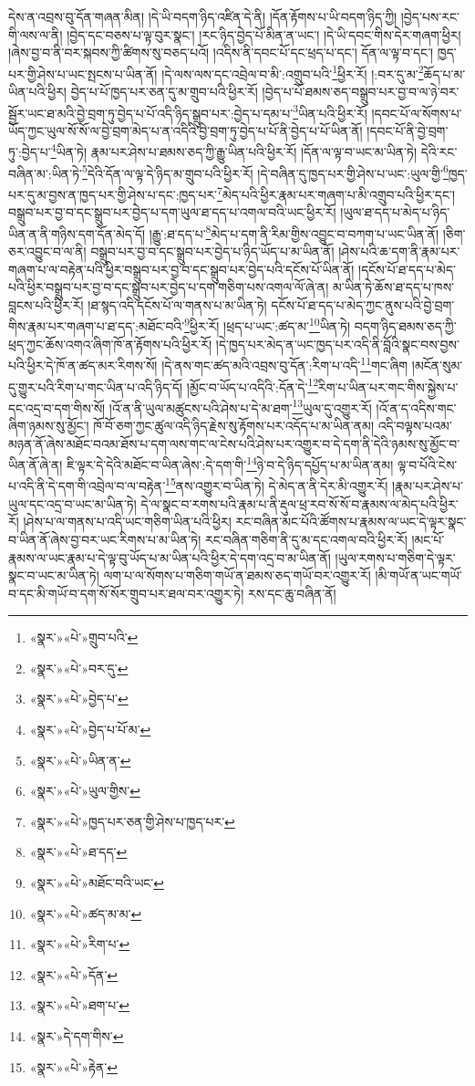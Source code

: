 དེས་ན་འབྲས་བུ་དོན་གཞན་མིན། །དེ་ཡི་བདག་ཉིད་འཛིན་དེ་ནི། །དོན་རྟོགས་པ་ཡི་བདག་ཉིད་ཀྱི། །བྱེད་པས་རང་གི་ལས་ལ་ནི། །བྱེད་དང་བཅས་པ་ལྟ་བུར་སྣང་། །རང་ཉིད་བྱེད་པོ་མིན་ན་ཡང་། །དེ་ཡི་དབང་གིས་དེར་གཞག་ཕྱིར། །ཞེས་བྱ་བ་ནི་བར་སྐབས་ཀྱི་ཚིགས་སུ་བཅད་པའོ། །འདིས་ནི་དབང་པོ་དང་ཕྲད་པ་དང་། དོན་ལ་ལྟ་བ་དང་། ཁྱད་པར་གྱི་ཤེས་པ་ཡང་སྤངས་པ་ཡིན་ནོ། །དེ་ལས་ལས་དང་འབྲེལ་བ་མི་:འགྲུབ་པའི་\footnote{«སྣར་»«པེ་»གྲུབ་པའི་}ཕྱིར་རོ། །:བར་དུ་མ་\footnote{«སྣར་»«པེ་»བར་དུ་}ཆོད་པ་མ་ཡིན་པའི་ཕྱིར། བྱེད་པ་པོ་ཁྱད་པར་ཅན་དུ་མ་གྲུབ་པའི་ཕྱིར་རོ། །བྱེད་པ་པོ་ཐམས་ཅད་བསྒྲུབ་པར་བྱ་བ་ལ་ཉེ་བར་སྦྱོར་ཡང་ཐ་མའི་བྱེ་བྲག་ཏུ་བྱེད་པ་པོ་འདི་ཉིད་སྒྲུབ་པར་:བྱེད་པ་དམ་པ་\footnote{«སྣར་»«པེ་»བྱེད་པ་}ཡིན་པའི་ཕྱིར་རོ། །དབང་པོ་ལ་སོགས་པ་ཡོད་ཀྱང་ཡུལ་སོ་སོ་ལ་བྱེ་བྲག་མེད་པ་ན་འདིའི་བྱེ་བྲག་ཏུ་བྱེད་པ་པོ་ནི་བྱེད་པ་པོ་ཡིན་ནོ། །དབང་པོ་ནི་བྱེ་བྲག་ཏུ་:བྱེད་པ་\footnote{«སྣར་»«པེ་»བྱེད་པ་པོ་མ་}ཡིན་ཏེ། རྣམ་པར་ཤེས་པ་ཐམས་ཅད་ཀྱི་རྒྱུ་ཡིན་པའི་ཕྱིར་རོ། །དོན་ལ་ལྟ་བ་ཡང་མ་ཡིན་ཏེ། དེའི་རང་བཞིན་མ་:ཡིན་ཏེ་\footnote{«སྣར་»«པེ་»ཡིན་ན་}དེའི་དོན་ལ་ལྟ་དེ་ཉིད་མ་གྲུབ་པའི་ཕྱིར་རོ། །དེ་བཞིན་དུ་ཁྱད་པར་གྱི་ཤེས་པ་ཡང་:ཡུལ་གྱི་\footnote{«སྣར་»«པེ་»ཡུལ་གྱིས་}ཁྱད་པར་དུ་མ་བྱས་ན་ཁྱད་པར་གྱི་ཤེས་པ་དང་:ཁྱད་པར་\footnote{«སྣར་»«པེ་»ཁྱད་པར་ཅན་གྱི་ཤེས་པ་ཁྱད་པར་}མེད་པའི་ཕྱིར་རྣམ་པར་གཞག་པ་མི་འགྲུབ་པའི་ཕྱིར་དང་། བསྒྲུབ་པར་བྱ་བ་དང་སྒྲུབ་པར་བྱེད་པ་དག་ཡུལ་ཐ་དད་པ་འགལ་བའི་ཡང་ཕྱིར་རོ། །ཡུལ་ཐ་དད་པ་མེད་པ་ཉིད་ཡིན་ན་ནི་གཉིས་དག་དོན་མེད་དོ། །རྒྱུ་:ཐ་དད་པ་\footnote{«སྣར་»«པེ་»ཐ་དད་}མེད་པ་དག་ནི་རིམ་གྱིས་འབྱུང་བ་བཀག་པ་ཡང་ཡིན་ནོ། །ཅིག་ཅར་འབྱུང་བ་ལ་ནི། བསྒྲུབ་པར་བྱ་བ་དང་སྒྲུབ་པར་བྱེད་པ་ཉིད་ཡོད་པ་མ་ཡིན་ནོ། །ཤེས་པའི་ཆ་དག་ནི་རྣམ་པར་གཞག་པ་ལ་བརྟེན་པའི་ཕྱིར་བསྒྲུབ་པར་བྱ་བ་དང་སྒྲུབ་པར་བྱེད་པའི་དངོས་པོ་ཡིན་ནོ། །དངོས་པོ་ཐ་དད་པ་མེད་པའི་ཕྱིར་བསྒྲུབ་པར་བྱ་བ་དང་སྒྲུབ་པར་བྱེད་པ་དག་གཅིག་པས་འགལ་ལོ་ཞེ་ན། མ་ཡིན་ཏེ་ཆོས་ཐ་དད་པ་ཁས་བླངས་པའི་ཕྱིར་རོ། །ཐ་སྙད་འདི་དངོས་པོ་ལ་གནས་པ་མ་ཡིན་ཏེ། དངོས་པོ་ཐ་དད་པ་མེད་ཀྱང་ནུས་པའི་བྱེ་བྲག་གིས་རྣམ་པར་གཞག་པ་ཐ་དད་:མཐོང་བའི་\footnote{«སྣར་»«པེ་»མཐོང་བའི་ཡང་}ཕྱིར་རོ། །ཕྲད་པ་ཡང་:ཚད་མ་\footnote{«སྣར་»«པེ་»ཚད་མ་མ་}ཡིན་ཏེ། བདག་ཉིད་ཐམས་ཅད་ཀྱི་ཕྲད་ཀྱང་ཆོས་འགའ་ཞིག་ཁོ་ན་རྟོགས་པའི་ཕྱིར་རོ། །དེ་ཁྱད་པར་མེད་ན་ཡང་ཁྱད་པར་འདི་ནི་བློའི་སྣང་བས་བྱས་པའི་ཕྱིར་དེ་ཁོ་ན་ཚད་མར་རིགས་སོ། །དེ་ནས་གང་ཚད་མའི་འབྲས་བུ་དོན་:རིག་པ་འདི་\footnote{«སྣར་»«པེ་»རིག་པ་}གང་ཞིག །མངོན་སུམ་དུ་གྱུར་པའི་རིག་པ་གང་ཡིན་པ་འདི་ཉིད་དོ། །མྱོང་བ་ཡོད་པ་འདིའི་:དོན་དེ་\footnote{«སྣར་»«པེ་»དོན་}རིག་པ་ཡིན་པར་གང་གིས་སྐྱེས་པ་དང་འདྲ་བ་དག་གིས་སོ། །འོ་ན་ནི་ཡུལ་མཚུངས་པའི་ཤེས་པ་དེ་མ་ཐག་\footnote{«སྣར་»«པེ་»ཐག་པ་}ཡུལ་དུ་འགྱུར་རོ། །འོ་ན་ད་འདིས་གང་ཞིག་ཉམས་སུ་མྱོང་། ཁོ་བོ་ཅག་ཀྱང་ཚུལ་འདི་ཉིད་རྗེས་སུ་རྟོགས་པར་འདོད་པ་མ་ཡིན་ནམ། འདི་བལྟས་པའམ་མཉན་ནོ་ཞེས་མཐོང་བའམ་ཐོས་པ་དག་ལས་གང་ལ་ངེས་པའི་ཤེས་པར་འགྱུར་བ་དེ་དག་ནི་དེའི་ཉམས་སུ་མྱོང་བ་ཡིན་ནོ་ཞེ་ན། ཇི་ལྟར་དེ་དེའི་མཐོང་བ་ཡིན་ཞེས་:དེ་དག་གི་\footnote{«སྣར་»དེ་དག་གིས་}ཉེ་བ་དེ་ཉིད་དཔྱོད་པ་མ་ཡིན་ནམ། ལྟ་བ་པོའི་ངེས་པ་འདི་ནི་དེ་དག་གི་འབྲེལ་བ་ལ་བརྟེན་\footnote{«སྣར་»«པེ་»རྟེན་}ནས་འགྱུར་བ་ཡིན་ཏེ། དེ་མེད་ན་ནི་དེར་མི་འགྱུར་རོ། །རྣམ་པར་ཤེས་པ་ཡུལ་དང་འདྲ་བ་ཡང་མ་ཡིན་ཏེ། དེ་ལ་སྣང་བ་རགས་པའི་རྣམ་པ་ནི་རྡུལ་ཕྲ་རབ་སོ་སོ་བ་རྣམས་ལ་མེད་པའི་ཕྱིར་རོ། །ཤེས་པ་ལ་གནས་པ་འདི་ཡང་གཅིག་ཡིན་པའི་ཕྱིར། རང་བཞིན་མང་པོའི་ཚོགས་པ་རྣམས་ལ་ཡང་དེ་ལྟར་སྣང་བ་ཡིན་ནོ་ཞེས་བྱ་བར་ཡང་རིགས་པ་མ་ཡིན་ཏེ། རང་བཞིན་གཅིག་ནི་དུ་མ་དང་འགལ་བའི་ཕྱིར་རོ། །མང་པོ་རྣམས་ལ་ཡང་རྣམ་པ་དེ་ལྟ་བུ་ཡོད་པ་མ་ཡིན་པའི་ཕྱིར་དེ་དག་འདྲ་བ་མ་ཡིན་ནོ། །ཡུལ་རགས་པ་གཅིག་དེ་ལྟར་སྣང་བ་ཡང་མ་ཡིན་ཏེ། ལག་པ་ལ་སོགས་པ་གཅིག་གཡོ་ན་ཐམས་ཅད་གཡོ་བར་འགྱུར་རོ། །མི་གཡོ་ན་ཡང་གཡོ་བ་དང་མི་གཡོ་བ་དག་སོ་སོར་གྲུབ་པར་ཐལ་བར་འགྱུར་ཏེ། རས་དང་ཆུ་བཞིན་ནོ། 